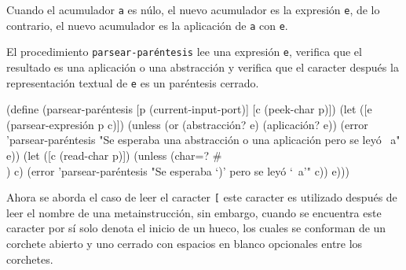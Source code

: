 Cuando el acumulador {\tt{}a} es núlo, el nuevo acumulador es la expresión {\tt{}e}, de lo contrario, el nuevo acumulador es la aplicación de {\tt{}a} con {\tt{}e}.

El procedimiento {\tt{}\protect{}parsear-paréntesis} lee una expresión {\tt{}e}, verifica que el resultado es una aplicación o una abstracción y verifica que el caracter después la representación textual de {\tt{}e} es un paréntesis cerrado.

\nwenddocs{}\plusendmoddef
(define (parsear-paréntesis [p (current-input-port)]
                            [c (peek-char p)])
  (let ([e (parsear-expresión p c)])
    (unless (or (abstracción? e) (aplicación? e))
      (error 'parsear-paréntesis
             "Se esperaba una abstracción o una aplicación pero se leyó ~a" e))
    (let ([c (read-char p)])
      (unless (char=? #\\) c)
        (error 'parsear-paréntesis
               "Se esperaba `)' pero se leyó `~a'" c))
      e)))

\eatline
{}\nwendcode{}\nwdocspar

Ahora se aborda el caso de leer el caracter {\tt{}{}{}[} este caracter es utilizado después de leer el nombre de una metainstrucción, sin embargo, cuando se encuentra este caracter por sí solo denota el inicio de un hueco, los cuales se conforman de un corchete abierto y uno cerrado con espacios en blanco opcionales entre los corchetes.


